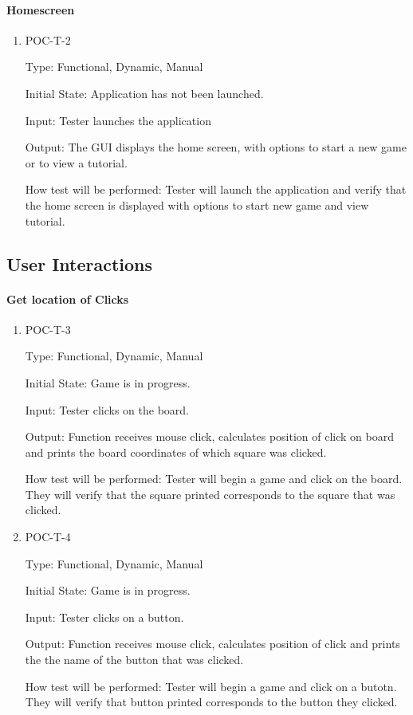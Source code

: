 \documentclass[12pt, titlepage]{article}
\begin{document}
\paragraph{Homescreen}
\begin{enumerate}

\item{POC-T-2}

Type: Functional, Dynamic, Manual

Initial State: Application has not been launched.

Input: Tester launches the application
	
Output: The GUI displays the home screen, with options to start a new game or to view a tutorial.
	
How test will be performed: Tester will launch the application and verify that the home screen is displayed with options to start new game and view tutorial.

\end{enumerate}

\subsection{User Interactions}
\paragraph{Get location of Clicks}
\begin{enumerate}
    \item{POC-T-3}

    Type: Functional, Dynamic, Manual

    Initial State: Game is in progress.

    Input: Tester clicks on the board.
	
    Output: Function receives mouse click, calculates position of click on board and prints the board coordinates of which square was clicked.
	
    How test will be performed: Tester will begin a game and click on the board. They will verify that the square printed corresponds to the square that was clicked.
    \item{POC-T-4}

    Type: Functional, Dynamic, Manual

    Initial State: Game is in progress.

    Input: Tester clicks on a button.
	
    Output: Function receives mouse click, calculates position of click and prints the the name of the button that was clicked.
	
    How test will be performed: Tester will begin a game and click on a butotn. They will verify that button printed corresponds to the button they clicked.
\end{enumerate}
\end{document}
